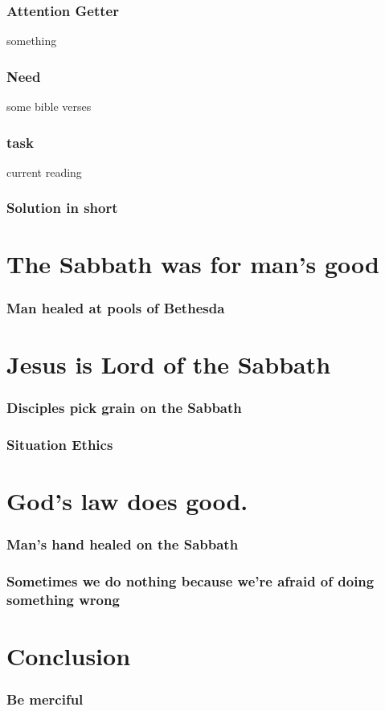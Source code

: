 \documentclass{beamer}
\begin{document}

\begin{frame}
\frametitle{Attention Getter}
something
\end{frame}

\begin{frame}
\frametitle{Need}
some bible verses
\end{frame}

\begin{frame}
\frametitle{task}
current reading
\end{frame}

\begin{frame}
\frametitle{Solution in short}
\end{frame}

\begin{frame}
\frametitle{\insertlecture}
\tableofcontents[sectionstyle=show/show]
\end{frame}

\section{The Sabbath was for man's good}
\begin{frame}
\frametitle{Man healed at pools of Bethesda}
\end{frame}

\begin{frame}
\frametitle{}
\end{frame}

\section{Jesus is Lord of the Sabbath}

\begin{frame}
\frametitle{Disciples pick grain on the Sabbath}
\end{frame}

\begin{frame}
\frametitle{Situation Ethics}
\end{frame}

\section{God's law does good.}

\begin{frame}
\frametitle{Man's hand healed on the Sabbath}
\end{frame}

\begin{frame}
\frametitle{Sometimes we do nothing because we're afraid of doing something wrong}
\end{frame}

\section*{Conclusion}
\begin{frame}
\frametitle{Be merciful}
\end{frame}
\end{document}
